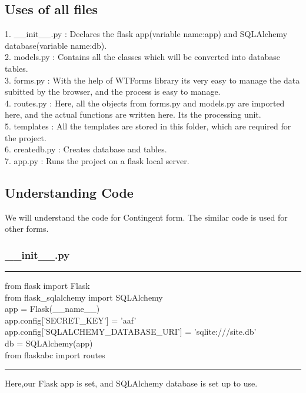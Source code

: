 \documentclass[journal,12pt,twocolumn]{IEEEtran}
\begin{document}
\subsection{\textbf{Uses of all files}}
\begin{flushleft}
1. \_\_init\_\_.py : Declares the flask app(variable name:app) and SQLAlchemy database(variable name:db). \\
2. models.py : Contains all the classes which will be converted into database tables.\\
3. forms.py : With the help of WTForms library its very easy to manage the data subitted by the browser, and the process is easy to manage.\\
4. routes.py : Here, all the objects from forms.py and models.py are imported here, and the actual functions are written here. Its the processing unit. \\
5. templates : All the templates are stored in this folder, which are required for the project. \\
6. createdb.py : Creates database and tables. \\
7. app.py : Runs the project on a flask local server. \\
\end{flushleft}

\subsection{\textbf{Understanding Code}}
\begin{flushleft}
We will understand the code for Contingent form. The similar code is used for other forms.
\end{flushleft}
\subsubsection{\textbf{\_\_init\_\_.py}}
\begin{flushleft}
\hrule
from flask import Flask \\
from flask\_sqlalchemy import SQLAlchemy \\
app = Flask(\_\_name\_\_) \\
app.config['SECRET\_KEY'] = 'aaf' \\
app.config['SQLALCHEMY\_DATABASE\_URI'] = 'sqlite:///site.db' \\
db = SQLAlchemy(app) \\

from flaskabc import routes \\
\hrule
Here,our Flask app is set, and SQLAlchemy database is set up to use.
\end{flushleft}
\end{document}
